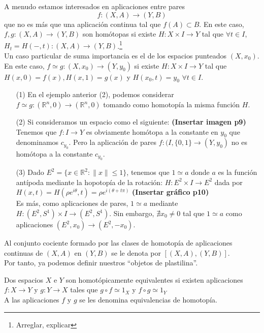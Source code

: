 A menudo estamos interesados en aplicaciones entre pares
$$f : (X, A) \rightarrow (Y, B)$$ que no es más que una aplicación continua tal que $f(A) \subset B$. En este caso, $f, g : (X, A) \rightarrow (Y, B)$ son homótopas si existe $H : X \times I \rightarrow Y$ tal que $\forall t \in I$, $H_t = H(-, t) : (X, A) \rightarrow (Y, B)$.\footnote{Arreglar, explicar}\\
Un caso particular de suma importancia es el de los espacios punteados $(X, x_0)$. En este caso, $f \simeq g : (X, x_0) \rightarrow (Y, y_0)$ si existe $H: X \times I \rightarrow Y$ tal que $H(x, 0) = f(x), H(x, 1) = g(x)$ y $H(x_0, t) = y_0$ $\forall t \in I$.\\
\begin{ejems}
\begin{itemize}
\item[(1)] En el ejemplo anterior (2), podemos considerar $f \simeq g : (\mathbb{R}^n, 0) \rightarrow (\mathbb{R}^n, 0)$ tomando como homotopía la misma función $H$.
\item[(2)] Si consideramos un espacio como el siguiente: \textbf{(Insertar imagen p9)} Tenemos que $f : I \rightarrow Y$ es obviamente homótopa a la constante en $y_0$ que denominamos $c_{y_0}$. Pero la aplicación de pares $f : (I, \{ 0,1 \} \rightarrow (Y, y_0)$ no es homótopa a la constante $c_{y_0}$.
\item[(3)] Dado $E^2 = \{ x \in \mathbb{R}^2 : \| x \| \leq 1 \}$, tenemos que $1 \simeq a$ donde $a$ es la función antípoda mediante la hopotopía de la rotación: $H : E^2 \times I \rightarrow E^2$ dada por $H(x, t) = H(\rho e^{i\theta}, t) = \rho e^{i(\theta + t\pi)}$ \textbf{(Insertar gráfico p10)}\\
Es más, como aplicaciones de pares, $1 \simeq a$ mediante $H : (E^2, S^1) \times I \rightarrow (E^2, S^1)$. Sin embargo, $\nexists x_0 \neq 0$ tal que $1 \simeq a$ como aplicaciones $(E^2, x_0) \rightarrow (E^2, -x_0)$.
\end{itemize}
\end{ejems}
Al conjunto cociente formado por las clases de homotopía de aplicaciones continuas de $(X, A)$ en $(Y, B)$ se le denota por $[(X, A), (Y, B)]$.\\
Por tanto, ya podemos definir nuestros ``objetos de plastilina''.
\begin{defin}
Dos espacios $X$ e $Y$ son homotópicamente equivalentes si existen aplicaciones $f: X \rightarrow Y$ y $g: Y \rightarrow X$ tales que $g \circ f \simeq 1_X$ y $f \circ g \simeq 1_Y$ \\
A las aplicaciones $f$ y $g$ se les denomina equivalencias de homotopía.
\end{defin}

